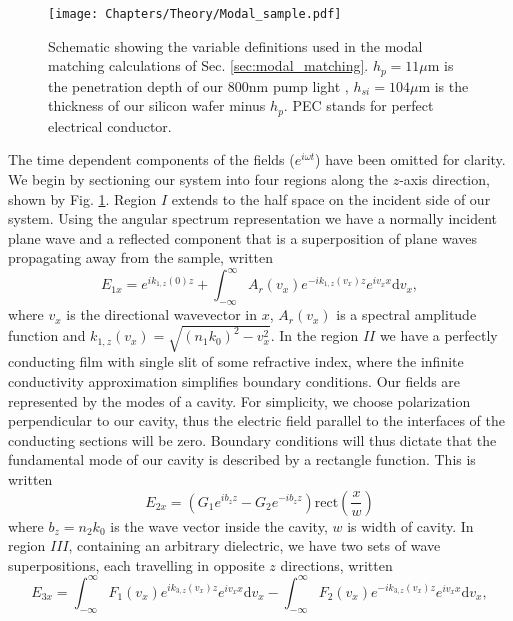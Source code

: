 \begin{figure}[ht]
\centering
\texttt{[image: Chapters/Theory/Modal\_sample.pdf]}
\caption{Schematic showing the variable definitions used in the modal matching calculations of Sec. \ref{sec:modal_matching}. $h_p=11\mu$m is the penetration depth of  our 800nm pump light \cite{si_depth}, $h_{si}=104\mu$m is the thickness of our silicon wafer minus $h_p$. PEC stands for perfect electrical conductor.}
\label{fig:modal_fig}
\end{figure}


The time dependent components of the fields ($e^{i\omega t}$) have been omitted for clarity. We begin by sectioning our system into four regions along the $z$-axis direction, shown by Fig. \ref{fig:modal_fig}. Region $I$ extends to the half space on the incident side of our system. Using the angular spectrum representation \cite{F.optics, scalar_near_fields} we have a normally incident plane wave and a reflected component that is a superposition of plane waves propagating away from the sample, written
\begin{equation} %
E_{1x}=e^{ik_{1,z}(0)z}+\int_{-\infty}^{\infty}A_r(v_x)e^{-ik_{1,z}(v_x)z}e^{iv_x x} \text{d}v_x,
\label{eq:E1x}
\end{equation}
where $v_x$ is the directional wavevector in $x$, $A_r(v_x)$ is a spectral amplitude function and $k_{1,z}(v_x)=\sqrt{(n_{\text{1}} k_0)^2-v_x^2}$. In the region $II$ we have a perfectly conducting film with single slit of some refractive index, where the infinite conductivity approximation simplifies boundary conditions. Our fields are represented by the modes of a cavity. For simplicity, we choose polarization perpendicular to our cavity, thus the electric field parallel to the interfaces of the conducting sections will be zero. Boundary conditions will thus dictate that the fundamental mode of our cavity is described by a rectangle function. This is written
\begin{equation}
E_{2x}=\left( G_{1}e^{ib_{z}z}-G_{2}e^{-ib_{z}z}\right) \text{rect}\left(\frac{x}{w}\right)
\label{eq:E2x}
\end{equation}
where $b_{z}=n_{\text{2}}k_0$ is the wave vector inside the cavity, $w$ is width of cavity. In region $III$, containing an arbitrary dielectric, we have two sets of wave superpositions, each travelling in opposite $z$ directions, written
\begin{equation} %
E_{3x}=\int_{-\infty}^{\infty}F_1(v_x)e^{ik_{3,z}(v_x)z}e^{iv_x x}\text{d}v_x-\int_{-\infty}^{\infty}F_2(v_x)e^{-ik_{3,z}(v_x)z}e^{iv_x x} \text{d}v_x,
\label{eq:E3x}
\end{equation}
